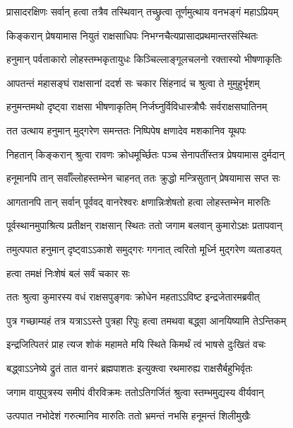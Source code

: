 \twolineshloka
{प्रासादरक्षिणः सर्वान् हत्वा तत्रैव तस्थिवान्}
{तच्छ्रुत्वा तूर्णमुत्थाय वनभङ्गं महाऽप्रियम्} %

\twolineshloka
{किङ्करान् प्रेषयामास नियुतं राक्षसाधिपः}
{निभग्नचैत्यप्रासादप्रथमान्तरसंस्थितः} %

\twolineshloka
{हनुमान् पर्वताकारो लोहस्तम्भकृतायुधः}
{किञ्चिल्लाङ्गूलचलनो रक्तास्यो भीषणाकृतिः} %

\twolineshloka
{आपतन्तं महासङ्घं राक्षसानां ददर्श सः}
{चकार सिंहनादं च श्रुत्वा ते मुमुहुर्भृशम्} %

\twolineshloka
{हनुमन्तमथो दृष्ट्वा राक्षसा भीषणाकृतिम्}
{निर्जघ्नुर्विविधास्त्रौघैः सर्वराक्षसघातिनम्} %

\twolineshloka
{तत उत्थाय हनुमान् मुद्गरेण समन्ततः}
{निष्पिपेष क्षणादेव मशकानिव यूथपः} %

\twolineshloka
{निहतान् किङ्करान् श्रुत्वा रावणः क्रोधमूर्च्छितः}
{पञ्च सेनापतींस्तत्र प्रेषयामास दुर्मदान्} %

\twolineshloka
{हनूमानपि तान् सर्वाँल्लोहस्तम्भेन चाहनत्}
{ततः क्रुद्धो मन्त्रिसुतान् प्रेषयामास सप्त सः} %

\twolineshloka
{आगतानपि तान् सर्वान् पूर्ववद् वानरेश्वरः}
{क्षणान्निःशेषतो हत्वा लोहस्तम्भेन मारुतिः} %

\twolineshloka
{पूर्वस्थानमुपाश्रित्य प्रतीक्षन् राक्षसान् स्थितः}
{ततो जगाम बलवान् कुमारोऽक्षः प्रतापवान्} %

\twolineshloka
{तमुत्पपात हनुमान् दृष्ट्वाऽऽकाशे समुद्गरः}
{गगनात् त्वरितो मूर्ध्नि मुद्गरेण व्यताडयत्} %

\onelineshloka
{हत्वा तमक्षं निःशेषं बलं सर्वं चकार सः} %

\twolineshloka
{ततः श्रुत्वा कुमारस्य वधं राक्षसपुङ्गवः}
{क्रोधेन महताऽऽविष्ट इन्द्रजेतारमब्रवीत्} %

\twolineshloka
{पुत्र गच्छाम्यहं तत्र यत्राऽऽस्ते पुत्रहा रिपुः}
{हत्वा तमथवा बद्\mbox{}ध्वा आनयिष्यामि तेऽन्तिकम्} %

\twolineshloka
{इन्द्रजित्पितरं प्राह त्यज शोकं महामते}
{मयि स्थिते किमर्थं त्वं भाषसे दुःखितं वचः} %

\twolineshloka
{बद्\mbox{}ध्वाऽऽनेष्ये द्रुतं तात वानरं ब्रह्मपाशतः}
{इत्युक्त्वा रथमारुह्य राक्षसैर्बहुभिर्वृतः} %

\twolineshloka
{जगाम वायुपुत्रस्य समीपं वीरविक्रमः}
{ततोऽतिगर्जितं श्रुत्वा स्तम्भमुद्यस्य वीर्यवान्} %

\twolineshloka
{उत्पपात नभोदेशं गरुत्मानिव मारुतिः}
{ततो भ्रमन्तं नभसि हनूमन्तं शिलीमुखैः} %

